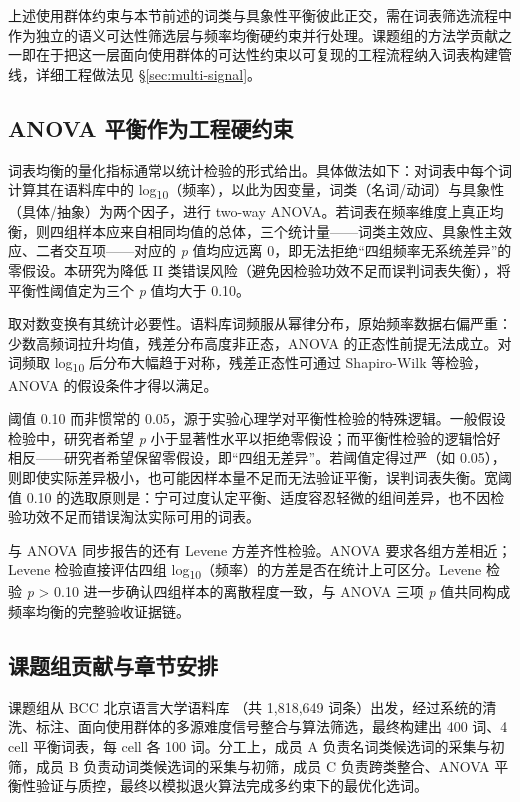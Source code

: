 \documentclass[12pt, a4paper]{article}
\begin{document}
上述使用群体约束与本节前述的词类与具象性平衡彼此正交，需在词表筛选流程中作为独立的语义可达性筛选层与频率均衡硬约束并行处理。课题组的方法学贡献之一即在于把这一层面向使用群体的可达性约束以可复现的工程流程纳入词表构建管线，详细工程做法见 \S\ref{sec:multi-signal}。

\subsection{ANOVA 平衡作为工程硬约束}

词表均衡的量化指标通常以统计检验的形式给出。具体做法如下：对词表中每个词计算其在语料库中的 log\textsubscript{10}（频率），以此为因变量，词类（名词/动词）与具象性（具体/抽象）为两个因子，进行 two-way ANOVA。若词表在频率维度上真正均衡，则四组样本应来自相同均值的总体，三个统计量——词类主效应、具象性主效应、二者交互项——对应的 \textit{p} 值均应远离 0，即无法拒绝“四组频率无系统差异”的零假设。本研究为降低 II 类错误风险（避免因检验功效不足而误判词表失衡），将平衡性阈值定为三个 \textit{p} 值均大于 0.10。

取对数变换有其统计必要性。语料库词频服从幂律分布，原始频率数据右偏严重：少数高频词拉升均值，残差分布高度非正态，ANOVA 的正态性前提无法成立。对词频取 log\textsubscript{10} 后分布大幅趋于对称，残差正态性可通过 Shapiro-Wilk 等检验，ANOVA 的假设条件才得以满足。

阈值 0.10 而非惯常的 0.05，源于实验心理学对平衡性检验的特殊逻辑。一般假设检验中，研究者希望 \textit{p} 小于显著性水平以拒绝零假设；而平衡性检验的逻辑恰好相反——研究者希望保留零假设，即“四组无差异”。若阈值定得过严（如 0.05），则即使实际差异极小，也可能因样本量不足而无法验证平衡，误判词表失衡。宽阈值 0.10 的选取原则是：宁可过度认定平衡、适度容忍轻微的组间差异，也不因检验功效不足而错误淘汰实际可用的词表。

与 ANOVA 同步报告的还有 Levene 方差齐性检验。ANOVA 要求各组方差相近；Levene 检验直接评估四组 log\textsubscript{10}（频率）的方差是否在统计上可区分。Levene 检验 \textit{p} > 0.10 进一步确认四组样本的离散程度一致，与 ANOVA 三项 \textit{p} 值共同构成频率均衡的完整验收证据链。

\subsection{课题组贡献与章节安排}

课题组从 BCC 北京语言大学语料库 \cite{xun2016bcc}（共 1,818,649 词条）出发，经过系统的清洗、标注、面向使用群体的多源难度信号整合与算法筛选，最终构建出 400 词、4 cell 平衡词表，每 cell 各 100 词。分工上，成员 A 负责名词类候选词的采集与初筛，成员 B 负责动词类候选词的采集与初筛，成员 C 负责跨类整合、ANOVA 平衡性验证与质控，最终以模拟退火算法完成多约束下的最优化选词。
\end{document}
